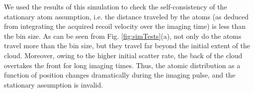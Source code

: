 \documentclass[12pt]{iopart}
\begin{document}
\par We used the results of this simulation to check the self-consistency of the  stationary atom assumption, i.e. the distance traveled by the atoms (as deduced from integrating the acquired recoil velocity over the imaging time) is less than the bin size. As can be seen from Fig. \ref{fig:simTests}(a), not only do the atoms travel more than the bin size, but they travel far beyond the initial extent of the cloud. Moreover, owing to the higher initial scatter rate, the back of the cloud overtakes the front for long imaging times. Thus, the atomic distribution as a function of position changes dramatically during the imaging pulse, and the stationary assumption is invalid.
\begin{figure}

\end{figure}
\end{document}
